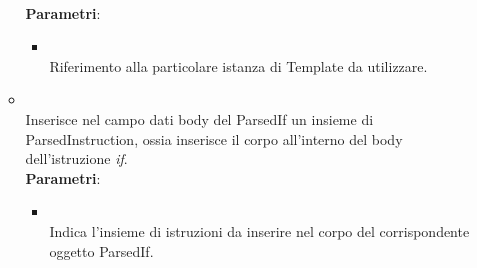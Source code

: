\begin{itemize}
\begin{itemize}
\\ \textbf{Parametri}:
\begin{itemize}
\item {}
\\ Riferimento alla particolare istanza di Template da utilizzare.
\end{itemize}
\item {}
\\ Inserisce nel campo dati body del ParsedIf un insieme di ParsedInstruction, ossia inserisce il corpo all'interno del body dell'istruzione \emph{if}.
\\ \textbf{Parametri}:
\begin{itemize}
\item {}
\\ Indica l'insieme di istruzioni da inserire nel corpo del corrispondente oggetto ParsedIf.
\end{itemize}
\end{itemize}
\end{itemize}

